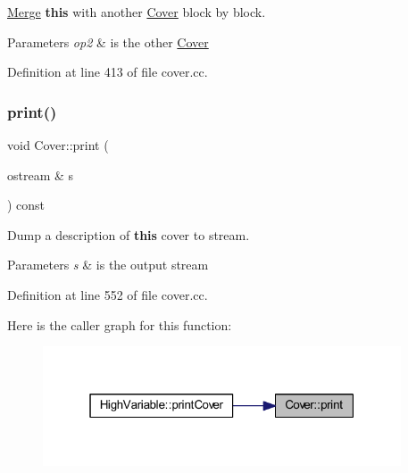 \mbox{\hyperlink{class_merge}{Merge}} {\bfseries{this}} with another \mbox{\hyperlink{class_cover}{Cover}} block by block. 


\begin{DoxyParams}{Parameters}
{\em op2} & is the other \mbox{\hyperlink{class_cover}{Cover}} \\
\hline
\end{DoxyParams}


Definition at line 413 of file cover.\+cc.

\mbox{\label{class_cover_acafb2a8598050f4c282c8df5bd937752}} 
\subsubsection{\texorpdfstring{print()}{print()}}
{\footnotesize\ttfamily void Cover\+::print (\begin{DoxyParamCaption}\item[{ostream \&}]{s }\end{DoxyParamCaption}) const}



Dump a description of {\bfseries{this}} cover to stream. 


\begin{DoxyParams}{Parameters}
{\em s} & is the output stream \\
\hline
\end{DoxyParams}


Definition at line 552 of file cover.\+cc.

Here is the caller graph for this function\+:
\nopagebreak
\begin{figure}[H]
\begin{center}
\leavevmode
\includegraphics[width=301pt]{class_cover_acafb2a8598050f4c282c8df5bd937752_icgraph}
\end{center}
\end{figure}
\mbox{\label{class_cover_a1d437f9e8a60e407587935411ed6d546}} 
